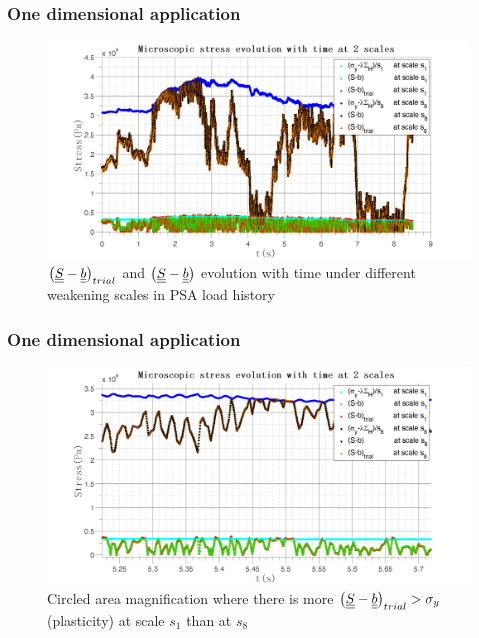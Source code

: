 \documentclass[xcolor=table]{Bredelebeamer}
\begin{document}
\begin{frame}
	\frametitle{One dimensional application}
\begin{figure}[!h]
	\centering
	\includegraphics[width=\textwidth]{figures//trialreal1d1.png} 
	\caption{$\left( \uline{\uline{S}}-\uline{\uline{b}}\right)_{trial}$ and $\left( \uline{\uline{S}}-\uline{\uline{b}}\right)$ evolution with time under different weakening scales in PSA load history}
	\label{trialreal}
\end{figure}
\end{frame}	

\begin{frame}
	\frametitle{One dimensional application}
	\begin{figure}[!h]
		\centering
		\includegraphics[width=\textwidth]{figures//trialreal1d2.png} 
		\caption{Circled area magnification where there is more $\left( \uline{\uline{S}}-\uline{\uline{b}}\right)_{trial}>\sigma_y$(plasticity) at scale $s_1$ than at $s_8$}
		\label{trialreal1d3}
	\end{figure}
\end{frame}	
\end{document}
